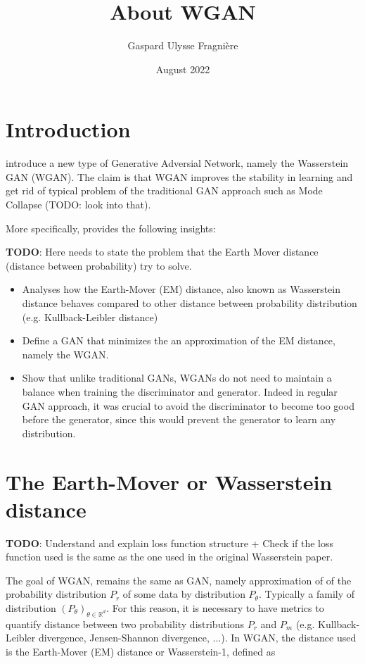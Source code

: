 \documentclass{article}
\title{About WGAN}
\author{Gaspard Ulysse Fragnière}
\date{August 2022}
\begin{document}
\maketitle

\section{Introduction}


\cite{arjovsky2017wasserstein} introduce a new type of Generative Adversial Network, namely the Wasserstein GAN (WGAN). The claim is that WGAN improves the stability in learning and get rid of typical problem of the traditional GAN approach such as Mode Collapse (TODO: look into that). 


More specifically, \cite{arjovsky2017wasserstein} provides the following insights:

\textbf{TODO}: Here needs to state the problem that the Earth Mover distance (distance between probability) try to solve.

\begin{itemize}
    \item Analyses how the Earth-Mover (EM) distance, also known as Wasserstein distance behaves compared to other distance between probability distribution (e.g. Kullback-Leibler distance)
    \item Define a GAN that minimizes the an approximation of the EM distance, namely the WGAN.
    \item Show that unlike traditional GANs, WGANs do not need to maintain a balance when training the discriminator and generator. Indeed in regular GAN approach, it was crucial to avoid the discriminator to become too good before the generator, since this would prevent the generator to learn any distribution. 
\end{itemize}


\section{The Earth-Mover or Wasserstein distance}

\textbf{TODO}: Understand and explain loss function structure + Check if the loss function used is the same as the one used in the original Wasserstein paper.

The goal of WGAN, remains the same as GAN, namely approximation of of the probability distribution $P_r$ of some data by distribution $P_{\theta}$. Typically a family of distribution $(P_{\theta})_{\theta \in \mathbb{R}^d}$. For this reason, it is necessary to have metrics to quantify distance between two probability distributions $P_r$ and $P_m$ (e.g. Kullback-Leibler divergence, Jensen-Shannon divergence, ...). In WGAN, the distance used is the Earth-Mover (EM) distance or Wasserstein-1, defined as 
\end{document}
